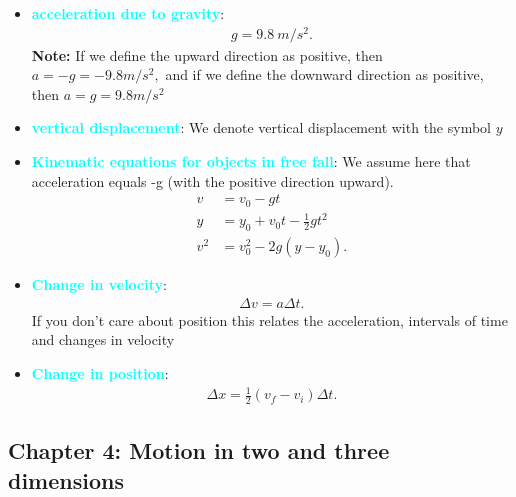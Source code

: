 \documentclass{report}
\begin{document}
\begin{itemize}
        \item \textbf{\textcolor{cyan}{acceleration due to gravity}}:
            \begin{align*}
                g = 9.8\ m/s^{2}
            .\end{align*}
            \textbf{Note:} If we define the upward direction as positive, then   $a=−g=-9.8m/s^{2},$ and if we define the downward direction as positive, then  $a=g=9.8m/s^{2}$
        \item \textbf{\textcolor{cyan}{vertical displacement}}: We denote vertical displacement with the symbol $y$
        \item \textbf{\textcolor{cyan}{Kinematic equations for objects in free fall}}: We assume here that acceleration equals -g (with the positive direction upward).
            \begin{align*}
                v &= v_{0} - gt \\
                y &= y_{0} + v_{0}t-\frac{1}{2}gt^{2} \\
                v^{2} &= v_{0}^{2} -2g(y-y_{0})
            .\end{align*}
        \item \textbf{\textcolor{cyan}{Change in velocity}}:
            \begin{align*}
                \Delta v = a\Delta t
            .\end{align*}
            If you don't care about position this relates the acceleration,  intervals of time and changes in velocity
        \item \textbf{\textcolor{cyan}{Change in position}}:
            \begin{align*}
                \Delta x = \frac{1}{2}(v_{f} - v_{i})\Delta t
            .\end{align*}
    \end{itemize}

    \pagebreak 
    \subsection{Chapter 4: Motion in two and three dimensions}
    \smallbreak \noindent
\end{document}

